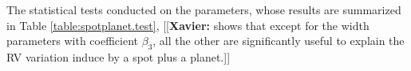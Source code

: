 \documentclass{aa}
\newcommand{\xavier}[1]{{\color{blue}[[\textbf{Xavier: }#1]]}}
\begin{document}
The statistical tests conducted on the parameters, whose results are summarized in Table \ref{table:spotplanet.test}, \xavier{shows that except for the width parameters with coefficient $\beta_3$, all the other are significantly useful to explain the RV variation induce by a spot plus a planet.}
\end{document}
